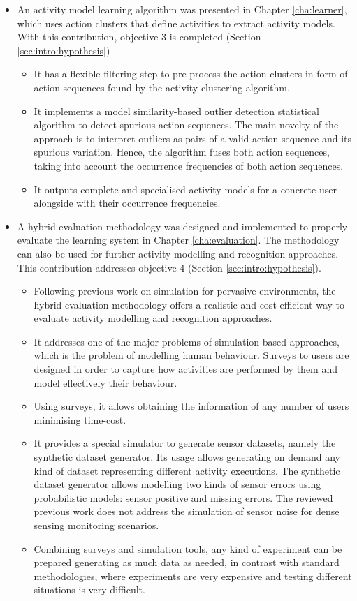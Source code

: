 \begin{itemize}
 \item An activity model learning algorithm was presented in Chapter \ref{cha:learner}, which uses action clusters that define activities to extract activity models. With this contribution, objective 3 is completed (Section \ref{sec:intro:hypothesis})  %
 \begin{itemize}
  \item It has a flexible filtering step to pre-process the action clusters in form of action sequences found by the activity clustering algorithm.
  \item It implements a model similarity-based outlier detection statistical algorithm to detect spurious action sequences. The main novelty of the approach is to interpret outliers as pairs of a valid action sequence and its spurious variation. Hence, the algorithm fuses both action sequences, taking into account the occurrence frequencies of both action sequences.
  \item It outputs complete and specialised activity models for a concrete user alongside with their occurrence frequencies.
 \end{itemize}

 \item A hybrid evaluation methodology was designed and implemented to properly evaluate the learning system in Chapter \ref{cha:evaluation}. The methodology can also be used for further activity modelling and recognition approaches. This contribution addresses objective 4 (Section \ref{sec:intro:hypothesis}). %
 \begin{itemize}
  \item Following previous work on simulation for pervasive environments, the hybrid evaluation methodology offers a realistic and cost-efficient way to evaluate activity modelling and recognition approaches.
  \item It addresses one of the major problems of simulation-based approaches, which is the problem of modelling human behaviour. Surveys to users are designed in order to capture how activities are performed by them and model effectively their behaviour.
  \item Using surveys, it allows obtaining the information of any number of users minimising time-cost.
  \item It provides a special simulator to generate sensor datasets, namely the synthetic dataset generator. Its usage allows generating on demand any kind of dataset representing different activity executions. The synthetic dataset generator allows modelling two kinds of sensor errors using probabilistic models: sensor positive and missing errors. The reviewed previous work does not address the simulation of sensor noise for dense sensing monitoring scenarios.
  \item Combining surveys and simulation tools, any kind of experiment can be prepared generating as much data as needed, in contrast with standard methodologies, where experiments are very expensive and testing different situations is very difficult.
 \end{itemize}

\end{itemize}
